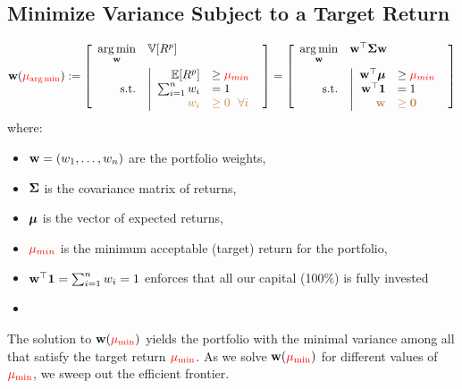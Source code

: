 \subsection{Minimize Variance Subject to a Target Return}

$$
\mbf w(\red{\mu_{\arg \min}}):=
\2{\begin{array}{rl}
\underset{\mbf w}{\arg \min} & \V [R^p]
\\ [1em]
\t{s.t.} & 
	\left|
	\begin{array}{rl}
	\E[R^p] &\geq \red{\mu_{min}}
	\\
	\sum_{i=1}^n w_i &= 1
	\\
	\brown{w_i} & \brown{\geq 0 ~~\forall i}
	\end{array}
	\right.
\end{array}
}
=
\2{\begin{array}{rl}
\underset{\mbf w}{\arg \min} & \mbf w\'\mbf \Sigma \mbf w
\\ [1em]
\t{s.t.} & 
	\left|
	\begin{array}{rl}
	\mbf w\'\b \mu  &\geq \red{\mu_{min}}
	\\
	\mbf w\'\mbf 1 &= 1
	\\
	\brown{\mbf w} & \brown{\geq \mbf 0}
	\end{array}
	\right.
\end{array}
}
$$
where:
\begin{itemize}
    \item $\mathbf w = (w_1, \ldots, w_n)$ are the portfolio weights,
    \item $\mathbf \Sigma$ is the covariance matrix of returns,
    \item $\boldsymbol \mu$ is the vector of expected returns,
    \item $\red{\mu_{min}}$ is the minimum acceptable (target) return for the portfolio,
    \item $\mathbf w^\top\mathbf 1 =\sum_{i=1}^n w_i = 1$ enforces that all our capital (100\%) is fully invested
    \item {}
\end{itemize}
The solution to $\mbf w(\red{\mu_{\min}})$ yields the portfolio with the minimal variance among all that satisfy the target return $\red{\mu_{\min}}$. As we solve $\mbf w(\red{\mu_{\min}})$ for different values of $\red{\mu_{\min}}$, we sweep out the efficient frontier.


